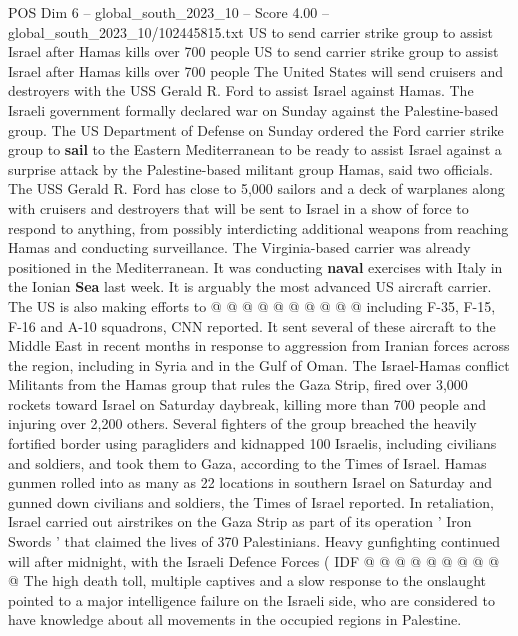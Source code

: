 \begin{textsample}{POS Dim 6 – global\_south\_2023\_10 – Score 4.00 – global\_south\_2023\_10/102445815.txt}  \label{ex:f6_pos_298}
US to send carrier strike group to assist Israel after Hamas kills over 700 people US to send carrier strike group to assist Israel after Hamas kills over 700 people The United States will send cruisers and destroyers with the USS Gerald R.
Ford to assist Israel against Hamas.
The Israeli government formally declared war on Sunday against the Palestine-based group.
The US Department of Defense on Sunday ordered the Ford carrier strike group to \textbf{sail} to the Eastern Mediterranean to be ready to assist Israel against a surprise attack by the Palestine-based militant group Hamas, said two officials.
The USS Gerald R.
Ford has close to 5,000 sailors and a deck of warplanes along with cruisers and destroyers that will be sent to Israel in a show of force to respond to anything, from possibly interdicting additional weapons from reaching Hamas and conducting surveillance.
The Virginia-based carrier was already positioned in the Mediterranean.
It was conducting \textbf{naval} exercises with Italy in the Ionian \textbf{Sea} last week.
It is arguably the most advanced US aircraft carrier.
The US is also making efforts to @ @ @ @ @ @ @ @ @ @ including F-35, F-15, F-16 and A-10 squadrons, CNN reported.
It sent several of these aircraft to the Middle East in recent months in response to aggression from Iranian forces across the region, including in Syria and in the Gulf of Oman.
The Israel-Hamas conflict Militants from the Hamas group that rules the Gaza Strip, fired over 3,000 rockets toward Israel on Saturday daybreak, killing more than 700 people and injuring over 2,200 others.
Several fighters of the group breached the heavily fortified border using paragliders and kidnapped 100 Israelis, including civilians and soldiers, and took them to Gaza, according to the Times of Israel.
Hamas gunmen rolled into as many as 22 locations in southern Israel on Saturday and gunned down civilians and soldiers, the Times of Israel reported.
In retaliation, Israel carried out airstrikes on the Gaza Strip as part of its operation ' Iron Swords ' that claimed the lives of 370 Palestinians.
Heavy gunfighting continued will after midnight, with the Israeli Defence Forces ( IDF @ @ @ @ @ @ @ @ @ @ The high death toll, multiple captives and a slow response to the onslaught pointed to a major intelligence failure on the Israeli side, who are considered to have knowledge about all movements in the occupied regions in Palestine.

\end{textsample}
